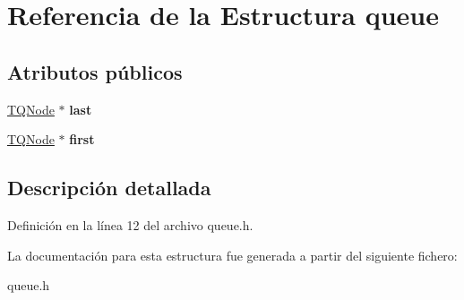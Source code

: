 \hypertarget{structqueue}{}\section{Referencia de la Estructura queue}
\label{structqueue}
\subsection*{Atributos públicos}
\begin{DoxyCompactItemize}
\item 
\mbox{\label{structqueue_a0f619f51d700644b5e1aca879730c413}} 
\hyperlink{structqueue_node}{T\+Q\+Node} $\ast$ {\bfseries last}
\item 
\mbox{\label{structqueue_aab52dd8e68b04363fa0775667c55e2b8}} 
\hyperlink{structqueue_node}{T\+Q\+Node} $\ast$ {\bfseries first}
\end{DoxyCompactItemize}


\subsection{Descripción detallada}


Definición en la línea 12 del archivo queue.\+h.



La documentación para esta estructura fue generada a partir del siguiente fichero\+:\begin{DoxyCompactItemize}
\item 
queue.\+h\end{DoxyCompactItemize}
